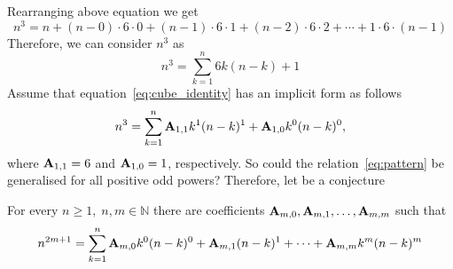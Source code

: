 Rearranging above equation we get
\[
    n^3 = n +(n-0) \cdot6 \cdot0 + (n-1)\cdot6\cdot1 + (n-2)\cdot6\cdot2 + \cdots+1\cdot6\cdot(n-1)
\]
Therefore, we can consider $n^3$ as
\begin{equation}
    \label{eq:cube_identity}
    n^3 = \sum_{k=1}^{n} 6k(n-k) + 1
\end{equation}
Assume that equation~\eqref{eq:cube_identity} has an implicit form as follows
\begin{equation}
    \label{eq:pattern}
    n^3 = \sum_{k=1}^{n} {\mathbf{A}} \sb{1,1} k^1(n-k)^1 + {\mathbf{A}} \sb{1,0} k^0(n-k)^0,
\end{equation}
where ${\mathbf{A}} \sb{1,1} = 6$ and ${\mathbf{A}} \sb{1,0} = 1$, respectively.
So could the relation~\eqref{eq:pattern} be generalised for all positive odd powers?
Therefore, let be a conjecture
\begin{conj}
    For every $n\geq 1, \; n,m\in\mathbb{N}$ there are coefficients ${\mathbf{A}} \sb{m,0}, {\mathbf{A}} \sb{m,1}, \ldots, {\mathbf{A}} \sb{m,m}$ such that
    \begin{equation*}
        \label{conjecture}
        n^{2m+1} = \sum_{k=1}^{n} {\mathbf{A}} \sb{m,0} k^0 (n-k)^0 + {\mathbf{A}} \sb{m,1} (n-k)^1
        + \cdots + {\mathbf{A}} \sb{m,m} k^m (n-k)^m
    \end{equation*}
\end{conj}